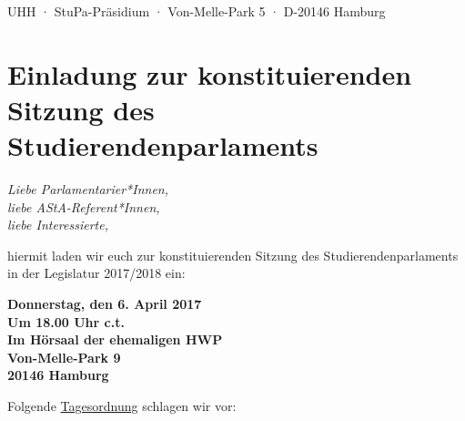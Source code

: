 \documentclass[ngerman,headheight=70pt]{scrartcl}
\begin{document}
    UHH · StuPa-Präsidium · Von-Melle-Park 5 · D-20146 Hamburg

    \section*{Einladung zur konstituierenden Sitzung des Studierendenparlaments}

    \textit{Liebe Parlamentarier*Innen,\\
    liebe AStA-Referent*Innen,\\
    liebe Interessierte,}

    hiermit laden wir euch zur konstituierenden Sitzung des Studierendenparlaments
    in der Legislatur 2017/2018 ein:

    \textbf{Donnerstag, den 6. April 2017\\
    Um 18.00 Uhr c.t.\\
    Im Hörsaal der ehemaligen HWP\\
    Von-Melle-Park 9\\
    20146 Hamburg}

    Folgende \underline{Tagesordnung} schlagen wir vor:
\end{document}
